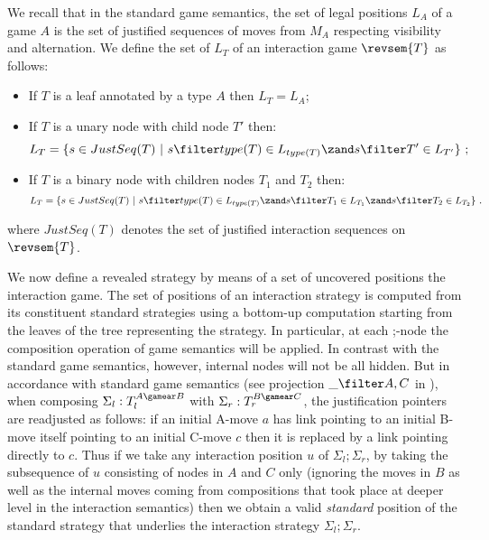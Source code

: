 \begin{definition} We recall
that in the standard game semantics, the set of legal positions
$L_A$ of a game $A$ is the set of justified sequences of moves from
$M_A$ respecting visibility and alternation. We define the set of
 $L_T$ of an interaction game $\revsem{T}$ as
follows:
    \begin{itemize}
    \item If $T$ is a leaf annotated by a type $A$ then $L_T =
    L_A$;
    \item If $T$ is a unary node with child node $T'$ then:
    $$L_T = \{ s \in JustSeq(T) \ | \ s \filter type(T) \in L_{type(T)} \zand  s \filter T' \in L_{T'} \} \ ;$$
    \item If $T$ is a binary node with children nodes $T_1$ and $T_2$ then:
    $$L_T = \{ s \in JustSeq(T) \ | \ s \filter type(T) \in L_{type(T)} \zand  s \filter T_1 \in L_{T_1}
    \zand  s \filter T_2 \in L_{T_2} \} \ .$$
    \end{itemize}
    where $JustSeq(T)$ denotes the set of justified interaction sequences on
    $\revsem{T}$.
\end{definition}


We now define a revealed strategy by means of a set of uncovered positions the interaction game.
The set of positions of an interaction strategy is computed from its constituent standard strategies using a bottom-up computation starting from the leaves of the tree representing the strategy. In particular, at each ;-node the composition operation of game semantics will be applied. In contrast with the standard game semantics, however, internal nodes will not be all hidden. But in accordance with standard game semantics (see projection $\_ \filter A,C$ in \cite{abramsky:game-semantics-tutorial}), when composing $\Sigma_l:T_l^{A\gamear B}$ with $\Sigma_r:T_r^{B\gamear C}$, the justification pointers are readjusted as follows: if an initial A-move $a$ has link pointing to an initial B-move itself pointing to an initial C-move $c$ then it is replaced by a link pointing directly to $c$. Thus if we take any interaction position $u$ of $\Sigma_l ; \Sigma_r$, by taking the subsequence of $u$ consisting of nodes in $A$ and $C$ only (ignoring the moves in $B$ as well as the internal moves coming from compositions that took place at deeper level in the interaction semantics) then we obtain a valid \emph{standard} position of the standard strategy that underlies the interaction strategy $\Sigma_l ; \Sigma_r$.

